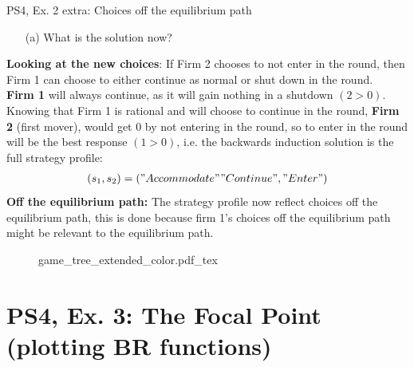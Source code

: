 \begin{frame}{PS4, Ex. 2 extra: Choices off the equilibrium path}
  \begin{multicols}{2}
    \begin{itemize}
      \item[(a)] What is the solution now?
    \end{itemize}
    \textbf{Looking at the new choices}: If Firm 2 chooses to not enter in the  round, then Firm 1 can choose to either continue as normal or shut down in the  round.\\\medskip
    \textbf{Firm 1} will always continue, as it will gain nothing in a shutdown $(2>0)$.\\\medskip
    Knowing that Firm 1 is rational and will choose to continue in the  round, \textbf{Firm 2} (first mover), would get 0 by not entering in the  round, so to enter in the  round will be the best response $(1>0)$, i.e. the backwards induction solution is the full strategy profile:
      \begin{align*}
        (s_1,s_2)=("Accommodate""Continue","Enter")
      \end{align*}
    \textbf{Off the equilibrium path:} The strategy profile now reflect choices off the equilibrium path, this is done because firm 1's choices off the equilibrium path might be relevant to the equilibrium path.
  \vfill\null \columnbreak
    \begin{figure}[!h]
      \begin{center}
      \def\svgwidth{1.0\columnwidth}
      {game_tree_extended_color.pdf_tex}
      \end{center}
    \end{figure}
  \vfill\null
  \end{multicols}
\end{frame}



\section{PS4, Ex. 3: The Focal Point (plotting BR functions)}

